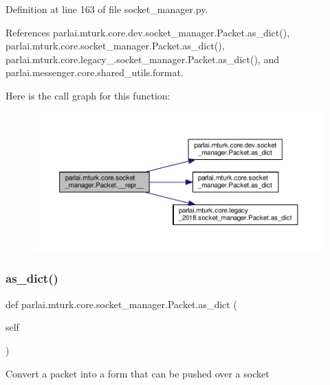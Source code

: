 Definition at line 163 of file socket\+\_\+manager.\+py.



References parlai.\+mturk.\+core.\+dev.\+socket\+\_\+manager.\+Packet.\+as\+\_\+dict(), parlai.\+mturk.\+core.\+socket\+\_\+manager.\+Packet.\+as\+\_\+dict(), parlai.\+mturk.\+core.\+legacy\+\_.\+socket\+\_\+manager.\+Packet.\+as\+\_\+dict(), and parlai.\+messenger.\+core.\+shared\+\_\+utils.\+format.

Here is the call graph for this function\+:
\nopagebreak
\begin{figure}[H]
\begin{center}
\leavevmode
\includegraphics[width=350pt]{classparlai_1_1mturk_1_1core_1_1socket__manager_1_1Packet_a140e38046a95501d5a7798f04b1553bb_cgraph}
\end{center}
\end{figure}
\mbox{\label{classparlai_1_1mturk_1_1core_1_1socket__manager_1_1Packet_a805fbc99169620a4a3c37a7892b5fab3}} 
\subsubsection{\texorpdfstring{as\+\_\+dict()}{as\_dict()}}
{\footnotesize\ttfamily def parlai.\+mturk.\+core.\+socket\+\_\+manager.\+Packet.\+as\+\_\+dict (\begin{DoxyParamCaption}\item[{}]{self }\end{DoxyParamCaption})}

\begin{DoxyVerb}Convert a packet into a form that can be pushed over a socket\end{DoxyVerb}
 

